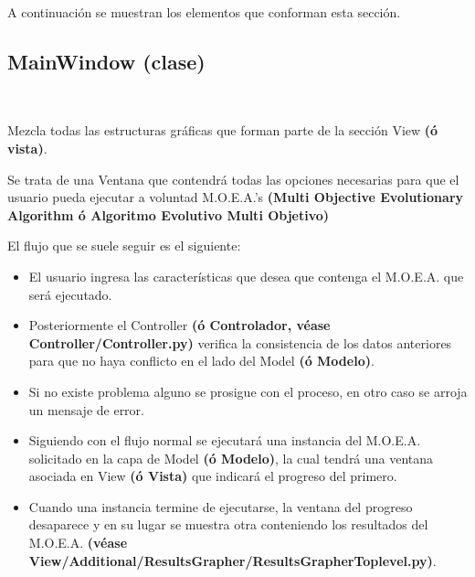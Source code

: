 \documentclass[letterpaper,10pt,english]{sphinxmanual}
\begin{document}
A continuación se muestran los elementos que conforman esta sección.


\subsection{MainWindow (clase)}
\label{View/MainWindow::doc}\label{View/MainWindow:module-View.MainWindow}\label{View/MainWindow:mainwindow-clase}

\begin{fulllineitems}
\label{View/MainWindow:View.MainWindow.MainWindow}~
\begin{DUlineblock}{0em}
\item[] Mezcla todas las estructuras gráficas que forman parte de la sección View \textbf{(ó vista)}.
\item[] Se trata de una Ventana que contendrá todas las opciones necesarias para que
el usuario pueda ejecutar a voluntad M.O.E.A.'s \textbf{(Multi Objective Evolutionary Algorithm
ó Algoritmo Evolutivo Multi Objetivo)}
\item[] 
\item[] El flujo que se suele seguir es el siguiente:
\end{DUlineblock}
\begin{itemize}
\item {} 
El usuario ingresa las características que desea que contenga el M.O.E.A. que será ejecutado.

\item {} 
Posteriormente el Controller \textbf{(ó Controlador, véase Controller/Controller.py)} verifica la consistencia de los datos anteriores para que no haya conflicto en el lado del Model \textbf{(ó Modelo)}.

\item {} 
Si no existe problema alguno se prosigue con el proceso, en otro caso se arroja un mensaje de error.

\item {} 
Siguiendo con el flujo normal se ejecutará una instancia del M.O.E.A. solicitado en la capa de Model \textbf{(ó Modelo)}, la cual tendrá una ventana asociada en View \textbf{(ó Vista)} que indicará el progreso del primero.

\item {} 
Cuando una instancia termine de ejecutarse, la ventana del progreso desaparece y en su lugar se muestra otra conteniendo los resultados del M.O.E.A. \textbf{(véase View/Additional/ResultsGrapher/ResultsGrapherToplevel.py)}.


\end{itemize}
\end{fulllineitems}
\end{document}
